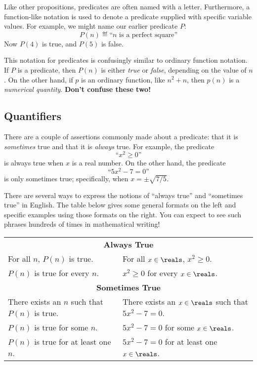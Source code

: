 Like other propositions, predicates are often named with a letter.
Furthermore, a function-like notation is used to denote a predicate
supplied with specific variable values.  For example, we might name
our earlier predicate $P$:
%
\[
P(n) \eqdef \text{``$n$ is a perfect square''}
\]
%
Now $P(4)$ is true, and $P(5)$ is false.

This notation for predicates is confusingly similar to ordinary function
notation.  If $P$ is a predicate, then $P(n)$ is either \emph{true} or
\emph{false}, depending on the value of $n$.  On the other hand, if $p$
is an ordinary function, like $n^2 + n$, then $p(n)$ is a
\emph{numerical quantity}.  \textbf{Don't confuse these two!}

\subsection{Quantifiers}

There are a couple of assertions commonly made about a predicate: that it
is \emph{sometimes} true and that it is \emph{always} true.  For
example, the predicate
%
\[
\text{``$x^2 \geq 0$''}
\]
%
is always true when $x$ is a real number.  On the other hand, the
predicate
%
\[
\text{``$5x^2 - 7 = 0$''}
\]
%
is only sometimes true; specifically, when $x = \pm \sqrt{7/5}$.

There are several ways to express the notions of ``always true'' and
``sometimes true'' in English.  The table below gives some general
formats on the left and specific examples using those formats on the
right.  You can expect to see such phrases hundreds of times in
mathematical writing!
%
\begin{center}
\begin{tabular}{ll}
\multicolumn{2}{c}{\textbf{Always True}} \\[1ex]
For all $n$, $P(n)$ is true. & For all $x \in \reals$, $x^2 \geq 0$. \\
$P(n)$ is true for every $n$. & $x^2 \geq 0$ for every $x \in \reals$. \\[2ex]
\multicolumn{2}{c}{\textbf{Sometimes True}} \\[1ex]
There exists an $n$ such that $P(n)$ is true. & There exists an $x \in \reals$ such that $5x^2 - 7 = 0$.\\
$P(n)$ is true for some $n$. & $5x^2 - 7 = 0$ for some $x \in \reals$.\\
$P(n)$ is true for at least one $n$. & $5x^2-7=0$ for at least one $x \in \reals$.
\end{tabular}
\end{center}

